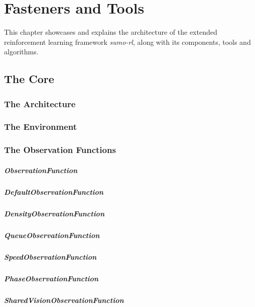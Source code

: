 \chapter{Fasteners and Tools}

This chapter showcases and explains the architecture of the extended reinforcement learning framework \textit{sumo-rl}, along with its components, tools and algorithms.

\section{The Core}

\subsection{The Architecture}

\subsection{The Environment}

\subsection{The Observation Functions}

\paragraph{ObservationFunction}
\paragraph{DefaultObservationFunction}
\paragraph{DensityObservationFunction}
\paragraph{QueueObservationFunction}
\paragraph{SpeedObservationFunction}
\paragraph{PhaseObservationFunction}
\paragraph{SharedVisionObservationFunction}

